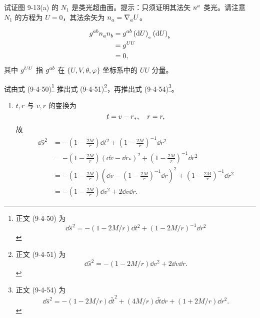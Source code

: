 \begin{xiti}
	\item 试证图 9-13(a) 的 $N_1$ 是类光超曲面。提示：只须证明其法矢 $\tensor{n}{^a}$ 类光。请注意 $N_1$ 的方程为 $U=0$，其法余矢为 $\tensor{n}{_a} = \Nabla{a} U$。
	\begin{zm}
		\begin{align*}
			\tensor{g}{^a^b} \tensor{n}{_a} \tensor{n}{_b} &= \tensor{g}{^a^b} \tensord{U}{_a} \tensord{U}{_b}\\
			&= \tensor{g}{^U^U}\\
			&= 0,
		\end{align*}
		其中 $\tensor{g}{^U^U}$ 指 $\tensor{g}{^a^b}$ 在 $\{ U, V, \theta, \varphi \}$ 坐标系中的 $UU$ 分量。
	\end{zm}

	\item 试由式 (9-4-50)\footnote{
		正文 (9-4-50) 为
		\begin{equation}
			\dd \hat{s}^2 = - \left( 1 - 2M/r \right) \dd t^2 + \left( 1 - 2M/r \right)^{-1} \dd r^2 \tag{9-4-50}
		\end{equation}
	} 推出式 (9-4-51)\footnote{
		正文 (9-4-51) 为
		\begin{equation}
			\dd \hat{s}^2 = - \left( 1 - 2M/r \right) \dd v^2 + 2 \dd v \dd r. \tag{9-4-51}
		\end{equation}
	}，再推出式 (9-4-54)\footnote{
		正文 (9-4-54) 为
		\begin{equation}
			\dd \hat{s}^2 = - \left( 1 - 2M/r \right) \dd{\tilde{t}}^2 + \left( 4M/r \right) \dd{\tilde{t}} \dd{r} + \left( 1 + 2M/r \right) \dd{r}^2. \tag{9-4-54}
		\end{equation}
	}。
	\begin{zm}
		\begin{enumerate}
			\item $t,r$ 与 $v,r$ 的变换为
				\begin{equation*}
					t = v-r_* \qc r = r,
				\end{equation*}
				故
				\begin{align*}
					\dd \hat{s}^2 &= - \left( 1 - \frac{2M}{r} \right) \dd t^2 + \left( 1 - \frac{2M}{r} \right)^{-1} \dd{r}^2\\
					&= - \left( 1 - \frac{2M}{r} \right) \left( \dd{v} - \dd{r_*} \right)^2 + \left( 1 - \frac{2M}{r} \right)^{-1} \dd{r}^2\\
					&= - \left( 1 - \frac{2M}{r} \right) \left( \dd{v} - \left( 1 - \frac{2M}{r} \right)^{-1} \dd{r} \right)^2 + \left( 1 - \frac{2M}{r} \right)^{-1} \dd{r}^2\\
					&= - \left( 1 - \frac{2M}{r} \right) \dd{v}^2 + 2 \dd{v} \dd{r}.

\end{align*}
\end{enumerate}
\end{zm}
\end{xiti}
